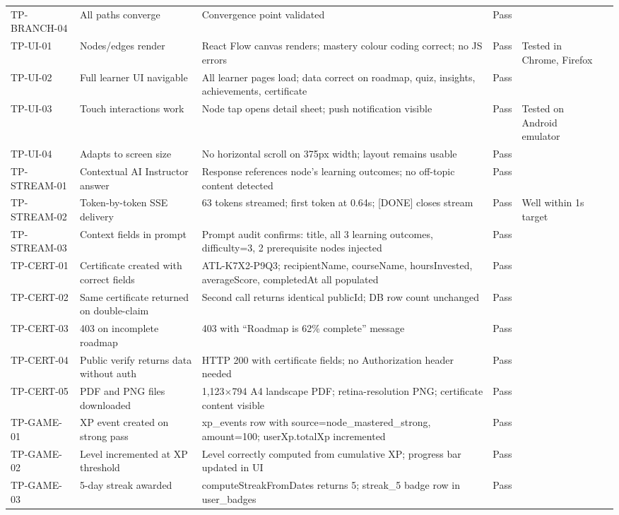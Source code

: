 \begin{longtable}{p{1.8cm}p{2.5cm}p{2.5cm}p{3cm}p{1.2cm}p{2.5cm}}
TP-BRANCH-04 & All paths converge & Convergence point validated & Pass & \\
TP-UI-01 & Nodes/edges render & React Flow canvas renders; mastery colour coding correct; no JS errors & Pass & Tested in Chrome, Firefox \\
TP-UI-02 & Full learner UI navigable & All learner pages load; data correct on roadmap, quiz, insights, achievements, certificate & Pass & \\
TP-UI-03 & Touch interactions work & Node tap opens detail sheet; push notification visible & Pass & Tested on Android emulator \\
TP-UI-04 & Adapts to screen size & No horizontal scroll on 375px width; layout remains usable & Pass & \\
TP-STREAM-01 & Contextual AI Instructor answer & Response references node's learning outcomes; no off-topic content detected & Pass & \\
TP-STREAM-02 & Token-by-token SSE delivery & 63 tokens streamed; first token at 0.64s; [DONE] closes stream & Pass & Well within 1s target \\
TP-STREAM-03 & Context fields in prompt & Prompt audit confirms: title, all 3 learning outcomes, difficulty=3, 2 prerequisite nodes injected & Pass & \\
TP-CERT-01 & Certificate created with correct fields & ATL-K7X2-P9Q3; recipientName, courseName, hoursInvested, averageScore, completedAt all populated & Pass & \\
TP-CERT-02 & Same certificate returned on double-claim & Second call returns identical publicId; DB row count unchanged & Pass & \\
TP-CERT-03 & 403 on incomplete roadmap & 403 with ``Roadmap is 62\% complete'' message & Pass & \\
TP-CERT-04 & Public verify returns data without auth & HTTP 200 with certificate fields; no Authorization header needed & Pass & \\
TP-CERT-05 & PDF and PNG files downloaded & 1,123$\times$794 A4 landscape PDF; retina-resolution PNG; certificate content visible & Pass & \\
TP-GAME-01 & XP event created on strong pass & xp\_events row with source=node\_mastered\_strong, amount=100; userXp.totalXp incremented & Pass & \\
TP-GAME-02 & Level incremented at XP threshold & Level correctly computed from cumulative XP; progress bar updated in UI & Pass & \\
TP-GAME-03 & 5-day streak awarded & computeStreakFromDates returns 5; streak\_5 badge row in user\_badges & Pass & \\

\end{longtable}
